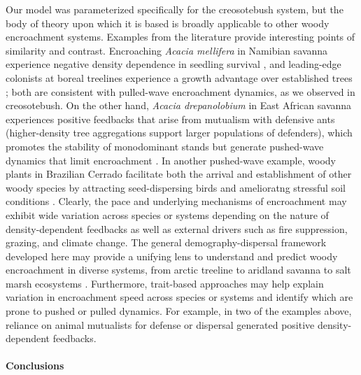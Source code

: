 \documentclass[11pt]{article}\usepackage[]{graphicx}\usepackage[usenames,dvipsnames]{xcolor}
\begin{document}
Our model was parameterized specifically for the creosotebush system, but the body of theory upon which it is based is broadly applicable to other woody encroachment systems. 
Examples from the literature provide interesting points of similarity and contrast. 
Encroaching \textit{Acacia mellifera} in Namibian savanna experience negative density dependence in seedling survival \citep{joubert2013influence}, and leading-edge colonists at boreal treelines experience a growth advantage over established trees \citep{dial2022sufficient}; both are consistent with pulled-wave encroachment dynamics, as we observed in creosotebush. 
On the other hand, \textit{Acacia drepanolobium} in East African savanna experiences positive feedbacks that arise from mutualism with defensive ants (higher-density tree aggregations support larger populations of defenders), which promotes the stability of monodominant stands but generate pushed-wave dynamics that limit encroachment \citep{kenfack2021understanding}. 
In another pushed-wave example, woody plants in Brazilian Cerrado facilitate both the arrival and establishment of other woody species by attracting seed-dispersing birds and amelioratng stressful soil conditions \citep{abreu2021facilitation}. 
Clearly, the pace and underlying mechanisms of encroachment may exhibit wide variation across species or systems depending on the nature of density-dependent feedbacks as well as external drivers such as fire suppression, grazing, and climate change. 
The general demography-dispersal framework developed here may provide a unifying lens to understand and predict woody encroachment in diverse  systems, from arctic treeline to aridland savanna to salt marsh ecosystems \citep{kelleway2017review}.
Furthermore, trait-based approaches may help explain variation in encroachment speed across species or systems and identify which are prone to pushed or pulled dynamics. 
For example, in two of the examples above, reliance on animal mutualists for defense or dispersal generated positive density-dependent feedbacks.

\paragraph{Conclusions}
\end{document}
